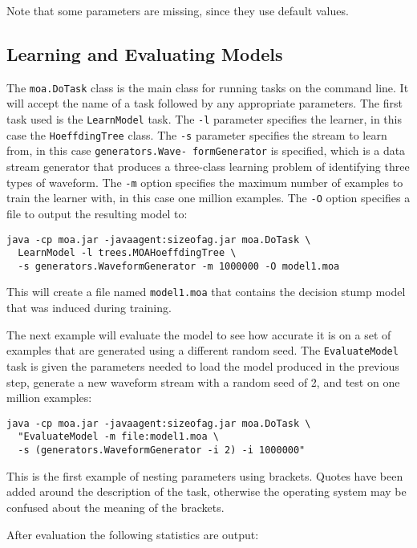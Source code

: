 \documentclass[a4paper,12pt]{article}
\begin{document}
Note that some parameters are missing, since they use default values.


\subsection{Learning and Evaluating Models}

The \verb+moa.DoTask+ class is the main class for running tasks on the command line. It will accept the name of a task followed by any appropriate parameters. The first task used is the \verb+LearnModel+ task. The \verb+-l+ parameter specifies the learner, in this case the \verb+HoeffdingTree+ class. The \verb+-s+ parameter specifies the stream to learn from, in this case {\tt generators.Wave- formGenerator} is specified, which is a data stream generator that produces a three-class learning problem of identifying three types of waveform. The \verb+-m+ option specifies the maximum number of examples to train the learner with, in this case one million examples. The \verb+-O+ option specifies a file to output the resulting model to:

\begin{verbatim}
java -cp moa.jar -javaagent:sizeofag.jar moa.DoTask \
  LearnModel -l trees.MOAHoeffdingTree \
  -s generators.WaveformGenerator -m 1000000 -O model1.moa
\end{verbatim}

This will create a file named \verb+model1.moa+ that contains the decision stump model that was induced during training.

The next example will evaluate the model to see how accurate it is on a set of examples that are generated using a different random seed. The \verb+EvaluateModel+ task is given the parameters needed to load the model produced in the previous step, generate a new waveform stream with a random seed of 2, and test on one million examples:

\begin{verbatim}
java -cp moa.jar -javaagent:sizeofag.jar moa.DoTask \
  "EvaluateModel -m file:model1.moa \
  -s (generators.WaveformGenerator -i 2) -i 1000000"
\end{verbatim}

This is the first example of nesting parameters using brackets. Quotes have been added around the description of the task, otherwise the operating system may be confused about the meaning of the brackets.

After evaluation the following statistics are output:
\end{document}
